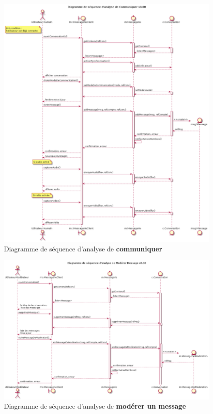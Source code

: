 \documentclass[11pt,dvipsnames,svgnames]{report}
\begin{document}
\begin{figure}[H]
\caption{Diagramme de séquence d'analyse de \textbf{communiquer}}
\centerline{\includegraphics[width=\textwidth]{diagrammes/dsa-communiquer.png}}
\end{figure}

\begin{figure}[H]
\caption{Diagramme de séquence d'analyse de \textbf{modérer un message}}
\centerline{\includegraphics[width=\textwidth]{diagrammes/dsa-moderer.png}}
\end{figure}
\end{document}
